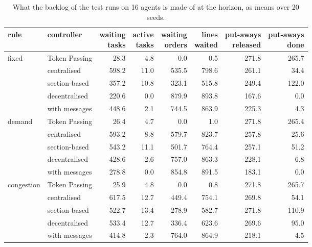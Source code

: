 \documentclass[11pt,a4paper]{article}
\newcommand{\new}[1]{\textcolor{newc}{#1}}
\begin{document}
\begin{table}[h]
  \centering
  \small
  \setlength{\tabcolsep}{4pt}
  \caption{\new{What the backlog of the test runs on 16 agents is made of at the horizon, as means over 20 seeds.}}
  \label{tab:app:backlog:16}
  \begin{tabular}{llrrrrrr}
    \toprule
    rule  &  controller  &  \shortstack{waiting\\tasks}  &  \shortstack{active\\tasks}  &  \shortstack{waiting\\orders}  &  \shortstack{lines\\waited}  &  \shortstack{put-aways\\released}  &  \shortstack{put-aways\\done} \\
    \midrule
    fixed      & Token Passing  & 28.3 & 4.8 & 0.0 & 0.5 & 271.8 & 265.7 \\
               & centralised    & 598.2 & 11.0 & 535.5 & 798.6 & 261.1 & 34.4 \\
               & section-based  & 357.2 & 10.8 & 323.1 & 515.8 & 249.4 & 122.0 \\
               & decentralised  & 220.6 & 0.0 & 879.9 & 893.8 & 167.6 & 0.0 \\
               & with messages  & 448.6 & 2.1 & 744.5 & 863.9 & 225.3 & 4.3 \\
    demand     & Token Passing  & 26.4 & 4.7 & 0.0 & 1.0 & 271.8 & 265.4 \\
               & centralised    & 593.2 & 8.8 & 579.7 & 823.7 & 257.8 & 25.6 \\
               & section-based  & 543.2 & 11.1 & 501.7 & 764.4 & 257.1 & 51.2 \\
               & decentralised  & 428.6 & 2.6 & 757.0 & 863.3 & 228.1 & 6.8 \\
               & with messages  & 278.8 & 0.0 & 854.8 & 891.5 & 183.1 & 0.0 \\
    congestion & Token Passing  & 25.9 & 4.8 & 0.0 & 0.8 & 271.8 & 265.7 \\
               & centralised    & 617.5 & 12.7 & 449.4 & 754.1 & 269.8 & 54.1 \\
               & section-based  & 522.7 & 13.4 & 278.9 & 582.7 & 271.8 & 110.9 \\
               & decentralised  & 533.4 & 12.7 & 336.4 & 623.6 & 269.6 & 95.0 \\
               & with messages  & 414.8 & 2.3 & 764.0 & 864.9 & 218.1 & 4.5 \\
    \bottomrule
  \end{tabular}
\end{table}
\end{document}
